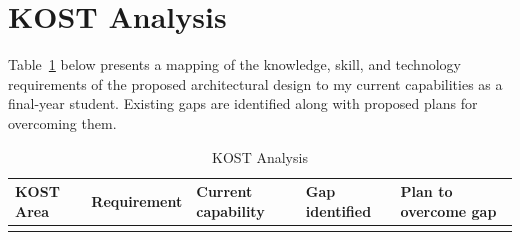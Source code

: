 \documentclass{article}
\begin{document}
\section{KOST Analysis}

Table~\ref{tab:kost_analysis} below presents a mapping of the knowledge, skill, and technology requirements of the proposed architectural design to my current capabilities as a final-year student. Existing gaps are identified along with proposed plans for overcoming them.

\vspace{-1em}

\renewcommand{\arraystretch}{1.5}

\begin{longtable}{|p{2cm}|p{2.5cm}|p{2.5cm}|p{3cm}|p{4cm}|}
\caption{KOST Analysis}
\label{tab:kost_analysis} \\
\hline
\textbf{KOST Area} & \textbf{Requirement} & \textbf{Current capability} & \textbf{Gap identified} & \textbf{Plan to overcome gap} \\
\hline
\endfirsthead

\hline
\endlastfoot


\end{longtable}
\end{document}
